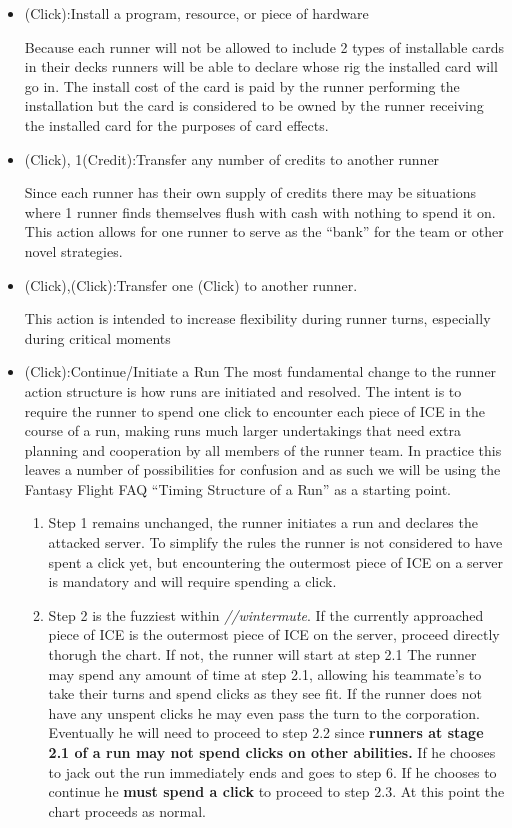 \documentclass[titlepage]{article}
\begin{document}
\begin{itemize}
	\item (Click):Install a program, resource, or piece of hardware

		Because each runner will not be allowed to include 2 types of installable cards in their decks runners will be able to declare whose rig the installed card will go in. The install cost of the card is paid by the runner performing the installation but the card is considered to be owned by the runner receiving the installed card for the purposes of card effects. 

	\item (Click), 1(Credit):Transfer any number of credits to another runner

		Since each runner has their own supply of credits there may be situations where 1 runner finds themselves flush with cash with nothing to spend it on. This action allows for one runner to serve as the ``bank'' for the team or other novel strategies.

	\item (Click),(Click):Transfer one (Click) to another runner.

		This action is intended to increase flexibility during runner turns, especially during critical moments

	\item (Click):Continue/Initiate a Run 
		The most fundamental change to the runner action structure is how runs are initiated and resolved. The intent is to require the runner to spend one click to encounter each piece of ICE in the course of a run, making runs much larger undertakings that need extra planning and cooperation by all members of the runner team. In practice this leaves a number of possibilities for confusion and as such we will be using the Fantasy Flight FAQ ``Timing Structure of a Run'' as a starting point. 
		\begin{enumerate}
			\item Step 1 remains unchanged, the runner initiates a run and declares the attacked server. To simplify the rules the runner is not considered to have spent a click yet, but encountering the outermost piece of ICE on a server is mandatory and will require spending a click. 
			\item Step 2 is the fuzziest within \emph{//wintermute}. If the currently approached piece of ICE is the outermost piece of ICE on the server, proceed directly thorugh the chart. If not, the runner will start at step 2.1 The runner may spend any amount of time at step 2.1, allowing his teammate's to take their turns and spend clicks as they see fit. If the runner does not have any unspent clicks he may even pass the turn to the corporation. Eventually he will need to proceed to step 2.2 since \textbf{runners at stage 2.1 of a run may not spend clicks on other abilities.} If he chooses to jack out the run immediately ends and goes to step 6. If he chooses to continue he \textbf{must spend a click} to proceed to step 2.3. At this point the chart proceeds as normal.
		\end{enumerate}
		

\end{itemize}
\end{document}

